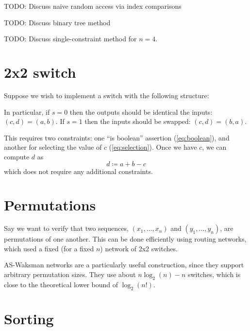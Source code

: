 \documentclass{article}
\begin{document}
TODO: Discuss naive random access via index comparisons

TODO: Discuss binary tree method

TODO: Discuss single-constraint method for $n = 4$.


\section{2x2 switch}

Suppose we wish to implement a switch with the following structure:
\begin{center}
\end{center}
In particular, if $s = 0$ then the outputs should be identical the inputs: $(c, d) = (a, b)$. If $s = 1$ then the inputs should be swapped: $(c, d) = (b, a)$.

This requires two constraints: one ``is boolean'' assertion (\autoref{eq:boolean}), and another for selecting the value of $c$ (\autoref{eq:selection}). Once we have $c$, we can compute $d$ as
\begin{equation}
  d \coloneqq a + b - c
\end{equation}
which does not require any additional constraints.


\section{Permutations} \label{sec:permutations}

Say we want to verify that two sequences, $(x_1, \dots, x_n)$ and $(y_1, \dots, y_n)$, are permutations of one another. This can be done efficiently using routing networks, which used a fixed (for a fixed $n$) network of 2x2 switches.

AS-Waksman networks \cite{beauquier2002arbitrary} are a particularly useful construction, since they support arbitrary permutation sizes. They use about $n \log_2(n) - n$ switches, which is close to the theoretical lower bound of $\log_2(n!)$.


\section{Sorting}
\end{document}
